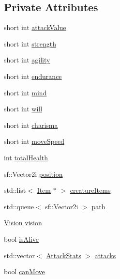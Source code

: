 \subsection*{Private Attributes}
\begin{DoxyCompactItemize}
\item 
short int \mbox{\hyperlink{class_base_creature_ac5a9c850146fa856dbf7fdd0def635ac}{attack\+Value}}
\item 
short int \mbox{\hyperlink{class_base_creature_a7f325c07376932d6e831dd00a350b806}{strength}}
\item 
short int \mbox{\hyperlink{class_base_creature_a23bbce83de8f7be2dfbcec7f5da223ab}{agility}}
\item 
short int \mbox{\hyperlink{class_base_creature_a74bc0648b11f9637b31ad5b76f056740}{endurance}}
\item 
short int \mbox{\hyperlink{class_base_creature_a8debd17b675db2ac6d944e2ccb314def}{mind}}
\item 
short int \mbox{\hyperlink{class_base_creature_a992cbd3a6be93279f2c933a50eba5000}{will}}
\item 
short int \mbox{\hyperlink{class_base_creature_aa62b65a4bd43be6e999d9a29a472fffe}{charisma}}
\item 
short int \mbox{\hyperlink{class_base_creature_a846cd45ba49c6496bdcb760651b9aaa8}{move\+Speed}}
\item 
int \mbox{\hyperlink{class_base_creature_a727462587a0ec421c549acf8c497de42}{total\+Health}}
\item 
sf\+::\+Vector2i \mbox{\hyperlink{class_base_creature_ac0aa7211db6bbc4033b0a11e6c34171b}{position}}
\item 
std\+::list$<$ \mbox{\hyperlink{class_item}{Item}} $\ast$ $>$ \mbox{\hyperlink{class_base_creature_a15a7a38b2a5bc15d1c3f8eda7e1d835b}{creature\+Items}}
\item 
std\+::queue$<$ sf\+::\+Vector2i $>$ \mbox{\hyperlink{class_base_creature_a0e419167e4986de0a4652b8979d66e16}{path}}
\item 
\mbox{\hyperlink{class_vision}{Vision}} \mbox{\hyperlink{class_base_creature_a8433c26fcbcb9bee87c35b15ae2e0814}{vision}}
\item 
bool \mbox{\hyperlink{class_base_creature_adeb6eed7546d84b1547e8134f582a6c7}{is\+Alive}}
\item 
std\+::vector$<$ \mbox{\hyperlink{struct_attack_stats}{Attack\+Stats}} $>$ \mbox{\hyperlink{class_base_creature_ab40c21845e4c19538b356bbcb01f7075}{attacks}}
\item 
bool \mbox{\hyperlink{class_base_creature_a484b63e12609985cc8b1b6c099eef9ee}{can\+Move}}
\end{DoxyCompactItemize}


